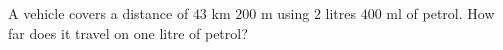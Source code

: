 A vehicle covers a distance of $43$ km $200$ m using $2$ litres $400$ ml of petrol. How far does it travel on one litre of petrol?
